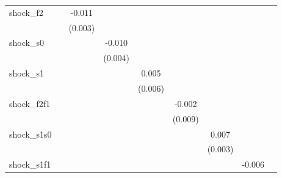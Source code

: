 {\begin{tabular}{l*{8}{c}}
\addlinespace
shock\_f2    &                     &      -0.011\sym{***}&                     &                     &                     &                     &                     &                     \\
            &                     &     (0.003)         &                     &                     &                     &                     &                     &                     \\
\addlinespace
shock\_s0    &                     &                     &      -0.010\sym{**} &                     &                     &                     &                     &                     \\
            &                     &                     &     (0.004)         &                     &                     &                     &                     &                     \\
\addlinespace
shock\_s1    &                     &                     &                     &       0.005         &                     &                     &                     &                     \\
            &                     &                     &                     &     (0.006)         &                     &                     &                     &                     \\
\addlinespace
shock\_f2f1  &                     &                     &                     &                     &      -0.002         &                     &                     &                     \\
            &                     &                     &                     &                     &     (0.009)         &                     &                     &                     \\
\addlinespace
shock\_s1s0  &                     &                     &                     &                     &                     &       0.007\sym{**} &                     &                     \\
            &                     &                     &                     &                     &                     &     (0.003)         &                     &                     \\
\addlinespace
shock\_s1f1  &                     &                     &                     &                     &                     &                     &      -0.006         &                     \\

\end{tabular}}
